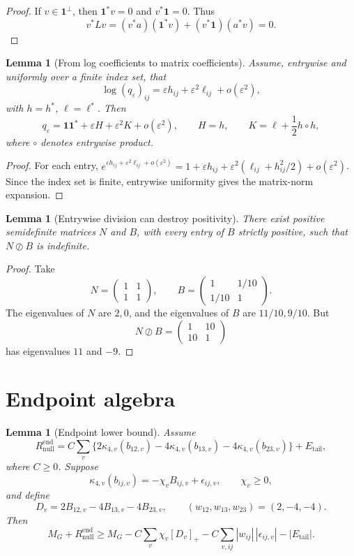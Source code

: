 \documentclass[11pt]{article}
\newtheorem{lemma}[theorem]{Lemma}
\newcommand{\one}{\mathbf 1}
\newcommand{\eps}{\varepsilon}
\newcommand{\Had}{\circ}
\newcommand{\odiv}{\oslash}
\begin{document}
\begin{proof}
If \(v\in\one^\perp\), then \(\one^*v=0\) and \(v^*\one=0\).  Thus
\[
  v^*Lv=(v^*a)(\one^*v)+(v^*\one)(a^*v)=0.
\]
\end{proof}

\begin{lemma}[From log coefficients to matrix coefficients]
\label{lem:app-log-HK}
Assume, entrywise and uniformly over a finite index set, that
\[
  \log (q_\eps)_{ij}=\eps h_{ij}+\eps^2\ell_{ij}+o(\eps^2),
\]
with \(h=h^*\), \(\ell=\ell^*\).  Then
\[
  q_\eps=\one\one^*+\eps H+\eps^2K+o(\eps^2),
  \qquad
  H=h,
  \qquad
  K=\ell+\frac12 h\Had h,
\]
where \(\Had\) denotes entrywise product.
\end{lemma}

\begin{proof}
For each entry, \(e^{\eps h_{ij}+\eps^2\ell_{ij}+o(\eps^2)}=1+\eps h_{ij}+\eps^2(\ell_{ij}+h_{ij}^2/2)+o(\eps^2)\).  Since the index set is finite, entrywise uniformity gives the matrix-norm expansion.
\end{proof}

\begin{lemma}[Entrywise division can destroy positivity]
\label{lem:app-entrywise-division}
There exist positive semidefinite matrices \(N\) and \(B\), with every entry of \(B\) strictly positive, such that \(N\odiv B\) is indefinite.
\end{lemma}

\begin{proof}
Take
\[
  N=\begin{pmatrix}1&1\\1&1\end{pmatrix},
  \qquad
  B=\begin{pmatrix}1&1/10\\1/10&1\end{pmatrix}.
\]
The eigenvalues of \(N\) are \(2,0\), and the eigenvalues of \(B\) are \(11/10,9/10\).  But
\[
  N\odiv B=\begin{pmatrix}1&10\\10&1\end{pmatrix}
\]
has eigenvalues \(11\) and \(-9\).
\end{proof}

\section{Endpoint algebra}
\label{app:endpoint-certificates}

\begin{lemma}[Endpoint lower bound]
\label{lem:app-endpoint-bound}
Assume
\[
  R_{\mathrm{null}}^{\mathrm{end}}
  =C\sum_v\{2\kappa_{4,v}(b_{12,v})-4\kappa_{4,v}(b_{13,v})-4\kappa_{4,v}(b_{23,v})\}
  +E_{\mathrm{tail}},
\]
where \(C\ge0\).  Suppose
\[
  \kappa_{4,v}(b_{ij,v})=-\chi_vB_{ij,v}+\epsilon_{ij,v},
  \qquad \chi_v\ge0,
\]
and define
\[
  D_v=2B_{12,v}-4B_{13,v}-4B_{23,v},
  \qquad (w_{12},w_{13},w_{23})=(2,-4,-4).
\]
Then
\[
  M_G+R_{\mathrm{null}}^{\mathrm{end}}
  \ge
  M_G-C\sum_v\chi_v[D_v]_+-C\sum_{v,ij}|w_{ij}|\,|\epsilon_{ij,v}|-|E_{\mathrm{tail}}|.
\]
\end{lemma}
\end{document}
